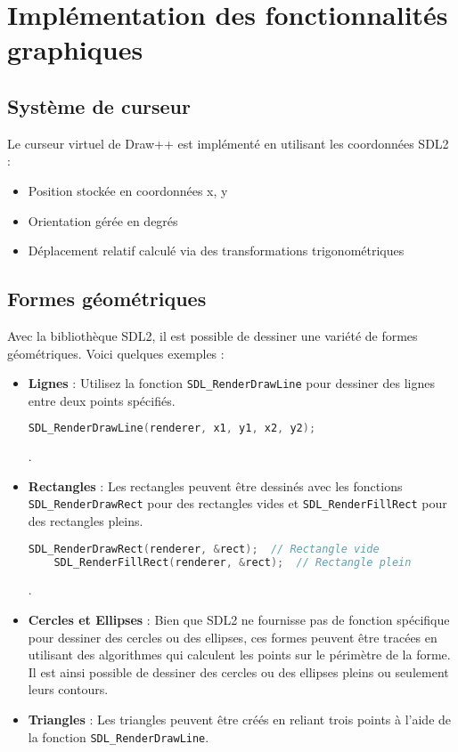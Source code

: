\documentclass[12pt,a4paper]{report}
\begin{document}
\section{Implémentation des fonctionnalités graphiques}

\subsection{Système de curseur}
Le curseur virtuel de Draw++ est implémenté en utilisant les coordonnées SDL2 :
\begin{itemize}
    \item Position stockée en coordonnées x, y
    \item Orientation gérée en degrés
    \item Déplacement relatif calculé via des transformations trigonométriques
\end{itemize}

\subsection{Formes géométriques}
Avec la bibliothèque SDL2, il est possible de dessiner une variété de formes géométriques. Voici quelques exemples :\\

\begin{itemize}
    \item \textbf{Lignes} \small : Utilisez la fonction \texttt{SDL\_RenderDrawLine} pour dessiner des lignes entre deux points spécifiés.
    \begin{lstlisting}[language=C]
    SDL_RenderDrawLine(renderer, x1, y1, x2, y2);
    \end{lstlisting}
    \newline.
    \item \textbf{Rectangles} \small : Les rectangles peuvent être dessinés avec les fonctions\\ \texttt{SDL\_RenderDrawRect} pour des rectangles vides et \texttt{SDL\_RenderFillRect} pour des rectangles pleins.
    \begin{lstlisting}[language=C]
    SDL_RenderDrawRect(renderer, &rect);  // Rectangle vide
    SDL_RenderFillRect(renderer, &rect);  // Rectangle plein
    \end{lstlisting}
    \newline.
    \item \textbf{Cercles et Ellipses} \small : Bien que SDL2 ne fournisse pas de fonction spécifique pour dessiner des cercles ou des ellipses, ces formes peuvent être tracées en utilisant des algorithmes qui calculent les points sur le périmètre de la forme. Il est ainsi possible de dessiner des cercles ou des ellipses pleins ou seulement leurs contours.\\
    \item \textbf{Triangles} \small : Les triangles peuvent être créés en reliant trois points à l’aide de la fonction \texttt{SDL\_RenderDrawLine}.\\
\end{itemize}
\end{document}
